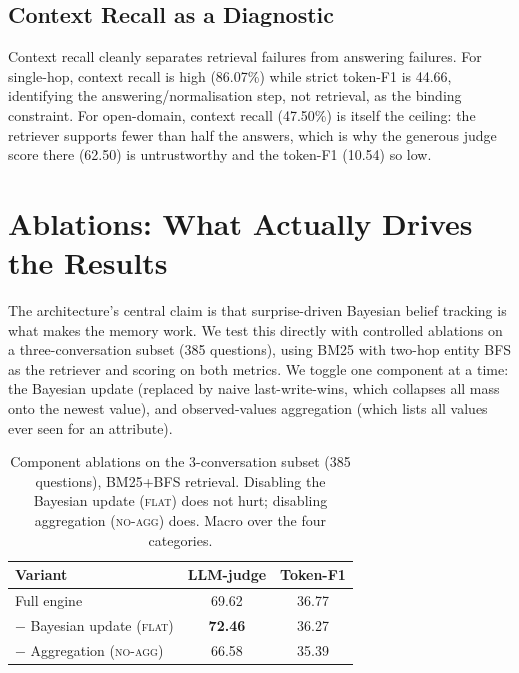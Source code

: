 \documentclass[11pt,a4paper,twocolumn]{article}
\begin{document}
\subsection{Context Recall as a Diagnostic}

Context recall cleanly separates retrieval failures from answering failures.
For single-hop, context recall is high (86.07\%) while strict token-F1 is 44.66,
identifying the answering/normalisation step, not retrieval, as the binding
constraint. For open-domain, context recall (47.50\%) is itself the ceiling:
the retriever supports fewer than half the answers, which is why the generous
judge score there (62.50) is untrustworthy and the token-F1 (10.54) so low.

\section{Ablations: What Actually Drives the Results}
\label{sec:ablations}

The architecture's central claim is that surprise-driven Bayesian belief
tracking is what makes the memory work. We test this directly with controlled
ablations on a three-conversation subset (385 questions), using BM25 with
two-hop entity BFS as the retriever and scoring on both metrics. We toggle one
component at a time: the Bayesian update (replaced by naive last-write-wins,
which collapses all mass onto the newest value), and observed-values
aggregation (which lists all values ever seen for an attribute).

\begin{table}[t]
\centering
\caption{Component ablations on the 3-conversation subset (385 questions),
BM25+BFS retrieval. Disabling the Bayesian update (\textsc{flat}) does not hurt;
disabling aggregation (\textsc{no-agg}) does. Macro over the four categories.}
\label{tab:ablation}
\renewcommand{\arraystretch}{1.25}
\setlength{\tabcolsep}{5pt}
\begin{tabular}{lcc}
\toprule
Variant & LLM-judge & Token-F1 \\
\midrule
Full engine                       & 69.62 & 36.77 \\
$-$ Bayesian update (\textsc{flat}) & \textbf{72.46} & 36.27 \\
$-$ Aggregation (\textsc{no-agg})   & 66.58 & 35.39 \\
\bottomrule
\end{tabular}
\end{table}
\end{document}
